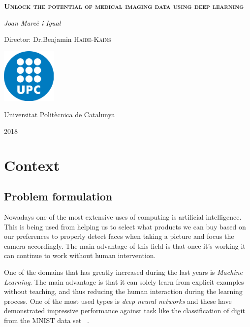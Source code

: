 \documentclass[a4paper]{article}
\begin{document}
\begin{titlepage}
    \centering
	\vspace{1.5cm}
	{\huge \textbf{\textsc{Unlock the potential of medical imaging data using deep learning}} \par}
	\vspace{2cm}
	{\Large \textit{Joan Marcè i Igual}\par}
	\vfill
    Director: Dr.Benjamin \textsc{Haibe-Kains}
    
    \vfill

    \includegraphics[width=0.2\textwidth]{images/logo_upc}\par\vspace{1cm}
	\vfill
    
    {\LARGE Universitat Politècnica de Catalunya \par}
    {\LARGE 2018 \par}
\end{titlepage}

\tableofcontents

\section{Context}

\subsection{Problem formulation}

Nowadays one of the most extensive uses of computing is artificial intelligence. This is being
used from helping us to select what products we can buy based on our preferences to properly detect
faces when taking a picture and focus the camera accordingly. The main advantage of this field is
that once it's working it can continue to work without human intervention.

One of the domains that has greatly increased during the last years is \emph{Machine Learning}.
The main advantage is that it can solely learn from explicit examples without
teaching, and thus reducing the human interaction during the learning process. One of the most used
types is \emph{deep neural networks} and these have demonstrated impressive performance against
task like the classification of digit from the MNIST data set
~\cites{MNIST}{empirical-evaluation-deep-architectures}.
\end{document}
